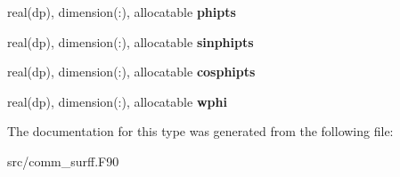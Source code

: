 \begin{DoxyCompactItemize}
real(dp), dimension(\+:), allocatable {\bfseries phipts}
\item 
\mbox{\label{structcomm__surff_1_1kgrid_a677c4c5e5107449ab31539cee38e42cc}} 
real(dp), dimension(\+:), allocatable {\bfseries sinphipts}
\item 
\mbox{\label{structcomm__surff_1_1kgrid_a2ccc8305f35a427a2b49ae8e729a3e37}} 
real(dp), dimension(\+:), allocatable {\bfseries cosphipts}
\item 
\mbox{\label{structcomm__surff_1_1kgrid_a8a92a006f5c84e4364969c803df935c3}} 
real(dp), dimension(\+:), allocatable {\bfseries wphi}
\end{DoxyCompactItemize}


The documentation for this type was generated from the following file\+:\begin{DoxyCompactItemize}
\item 
src/comm\+\_\+surff.\+F90\end{DoxyCompactItemize}
